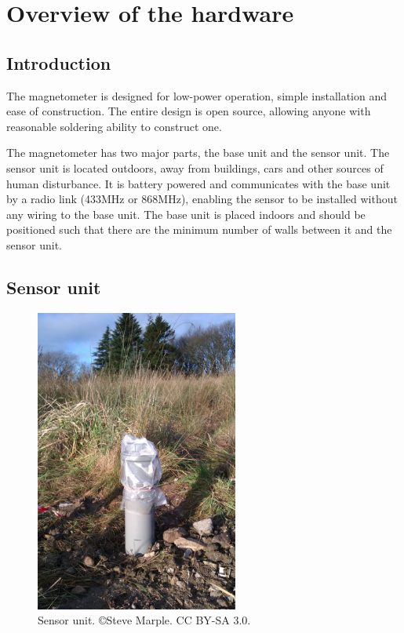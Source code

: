 \chapter{Overview of the hardware}

\section{Introduction}
The magnetometer is designed for low-power operation, simple
installation and ease of construction. The entire design is open
source, allowing anyone with reasonable soldering ability to construct
one.

The magnetometer has two major parts, the base unit and the sensor
unit. The sensor unit is located outdoors, away from buildings, cars
and other sources of human disturbance. It is battery powered and
communicates with the base unit by a radio link (433MHz or 868MHz),
enabling the sensor to be installed without any wiring to the base
unit. The base unit is placed indoors and should be positioned such
that there are the minimum number of walls between it and the sensor
unit.

\section{Sensor unit}

\begin{figure}
  \centering
  \includegraphics[keepaspectratio,height=10cm]{images/sensor-unit}
  \caption[Sensor unit]%
  {Sensor unit. \small{\copyright Steve Marple. CC BY-SA 3.0.}}
  \label{fig:sensor-unit}
\end{figure}

